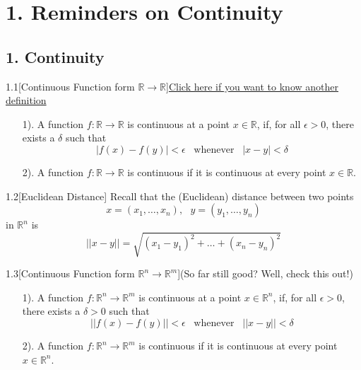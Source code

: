 \section*{1. Reminders on Continuity}
\subsection*{1. Continuity}
\begin{customdefinition}{1.1}[Continuous Function form $\mathbb{R} \longrightarrow \mathbb{R}$]\hypertarget{d_1.1}{\hyperlink{d_3.1}{Click here if you want to know another definition}}
\begin{enumerate}
    \item[1).] A function $f: \mathbb{R} \longrightarrow \mathbb{R}$ is continuous at a point $x \in \mathbb{R}$, if, for all $\epsilon > 0$, there exists a $\delta$ such that 
    $$\left|f(x) - f(y)\right| < \epsilon\,\,\, \text{ whenever }\,\,\, |x- y| < \delta$$
    \item[2).] A function $f: \mathbb{R} \longrightarrow \mathbb{R}$ is continuous if it is continuous at every point $x\in \mathbb{R}$.
\end{enumerate}
\end{customdefinition}

\begin{customdefinition}{1.2}[Euclidean Distance]
Recall that the (Euclidean) distance between two points
$$x = (x_1, \dots, x_n),\,\,\,\,y = (y_1, \dots, y_n)$$
in $\mathbb{R}^n$ is 
$$||x - y|| = \sqrt{(x_1 - y_1)^2 + \dots + (x_n - y_n)^2}$$
\end{customdefinition}

\begin{customdefinition}{1.3}[Continuous Function form $\mathbb{R}^n \longrightarrow \mathbb{R}^m$](So far still good? Well, check this out!)
\begin{enumerate}
    \item[1).] A function $f: \mathbb{R}^n \longrightarrow \mathbb{R}^m$ is continuous at a point $x \in \mathbb{R}^n$, if, for all $\epsilon > 0$, there exists a $\delta > 0$ such that 
    $$\lvert\lvert f(x) - f(y)\rvert\rvert < \epsilon\,\,\, \text{ whenever }\,\,\, \lvert\lvert x - y \rvert\rvert < \delta$$
    \item[2).] A function $f: \mathbb{R}^n \longrightarrow \mathbb{R}^m$ is continuous if it is continuous at every point $x\in \mathbb{R}^n$.
\end{enumerate}
\end{customdefinition}

